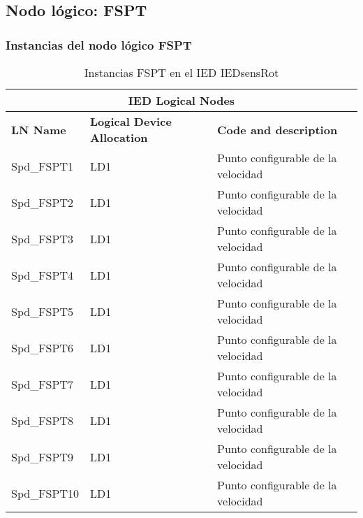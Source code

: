 
\subsection{Nodo l\'ogico: 			 FSPT}

    \subsubsection{Instancias del nodo l\'ogico FSPT}
    \begin{table}[H]
    \begin{center}
    \begin{tabular}{|l|l|p{6.8cm}|}
            \hline
            \multicolumn{3}{|c|}{\cellcolor[gray]{0.8} \textbf{IED Logical Nodes} } \\
            \hline
            \textbf{LN Name} & \textbf{Logical Device Allocation} & \textbf{Code and description} \\
            \hline
            Spd\_FSPT1 & LD1 & Punto configurable de la velocidad \\
            \hline
            Spd\_FSPT2 & LD1 & Punto configurable de la velocidad \\
            \hline
            Spd\_FSPT3 & LD1 & Punto configurable de la velocidad \\
            \hline
            Spd\_FSPT4 & LD1 & Punto configurable de la velocidad \\
            \hline
            Spd\_FSPT5 & LD1 & Punto configurable de la velocidad \\
            \hline
            Spd\_FSPT6 & LD1 & Punto configurable de la velocidad \\
            \hline
            Spd\_FSPT7 & LD1 & Punto configurable de la velocidad \\
            \hline
            Spd\_FSPT8 & LD1 & Punto configurable de la velocidad \\
            \hline
            Spd\_FSPT9 & LD1 & Punto configurable de la velocidad \\
            \hline
            Spd\_FSPT10 & LD1 & Punto configurable de la velocidad \\
            \hline
    \end{tabular}
    \caption{Instancias FSPT en el IED IEDsensRot}
    \label{table:lnInstFSPT_1}
    \end{center}
    \end{table}
    
    
    
